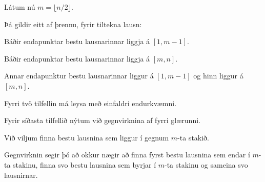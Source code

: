 {
    {
        \item<1-> Látum nú $m = \lfloor n/2 \rfloor$.
        \item<2-> Þá gildir eitt af þrennu, fyrir tiltekna lausn:
        {
            \item<3-> Báðir endapunktar bestu lausnarinnar liggja á $[1, m - 1]$.
            \item<4-> Báðir endapunktar bestu lausnarinnar liggja á $[m, n]$.
            \item<5-> Annar endapunktur bestu lausnarinnar liggur á $[1, m - 1]$ og hinn liggur á $[m, n]$.
        }
        \item<6-> Fyrri tvö tilfellin má leysa með einfaldri endurkvæmni.
        \item<7-> Fyrir síðasta tilfellið nýtum við gegnvirknina af fyrri glærunni.
        \item<8-> Við viljum finna bestu lausnina sem liggur í gegnum $m$-ta stakið.
        \item<9-> Gegnvirknin segir þó að okkur nægir að finna fyrst bestu lausnina sem endar í $m$-ta stakinu,
                    finna svo bestu lausnina sem byrjar í $m$-ta stakinu og
                    sameina svo lausnirnar.
    }
}

{
}

{
}



